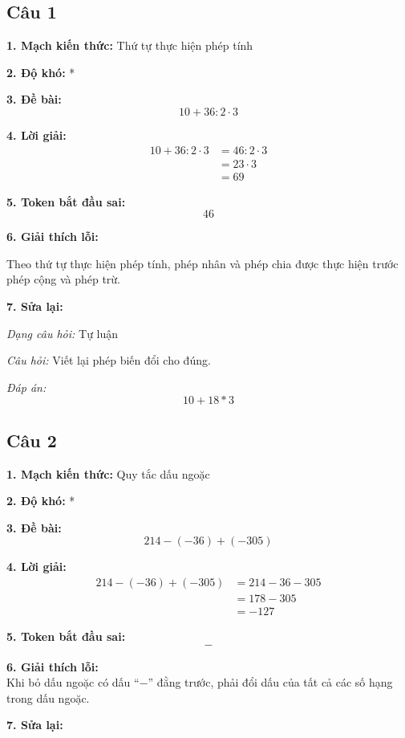 \subsection*{Câu 1}

\noindent\textbf{1. Mạch kiến thức:} Thứ tự thực hiện phép tính

\noindent\textbf{2. Độ khó:} *

\noindent\textbf{3. Đề bài:}
\[
10 + 36 : 2 \cdot 3
\]

\noindent\textbf{4. Lời giải:}
\begin{align*}
10 + 36 : 2 \cdot 3
    &= 46 : 2 \cdot 3 \\
    &= 23 \cdot 3 \\
    &= 69
\end{align*}

\noindent\textbf{5. Token bắt đầu sai:}
\[
46
\]

\noindent\textbf{6. Giải thích lỗi:}

Theo thứ tự thực hiện phép tính, phép nhân và phép chia được thực hiện trước phép cộng và phép trừ.

\noindent\textbf{7. Sửa lại:}

\textit{Dạng câu hỏi:} Tự luận

\textit{Câu hỏi:} Viết lại phép biến đổi cho đúng.

\textit{Đáp án:}
\[
10 + 18 * 3
\]

\subsection*{Câu 2}

\noindent\textbf{1. Mạch kiến thức:} Quy tắc dấu ngoặc

\noindent\textbf{2. Độ khó:} *

\noindent\textbf{3. Đề bài:}
\[
214-(-36)+(-305)
\]

\noindent\textbf{4. Lời giải:}
\begin{align*}
214-(-36)+(-305)
    &= 214-36-305 \\
    &= 178-305 \\
    &= -127
\end{align*}

\noindent\textbf{5. Token bắt đầu sai:}
\[
-
\]

\noindent\textbf{6. Giải thích lỗi:}\\
Khi bỏ dấu ngoặc có dấu ``$-$'' đằng trước, phải đổi dấu của tất cả các số hạng trong dấu ngoặc.

\noindent\textbf{7. Sửa lại:}

